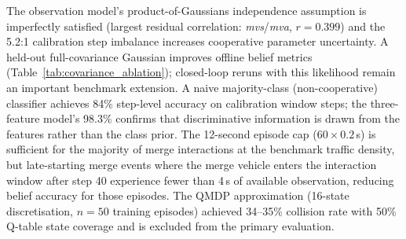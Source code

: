 The observation model's product-of-Gaussians independence assumption is
imperfectly satisfied (largest residual correlation: \emph{mvs}/\emph{mva},
$r{=}0.399$) and the 5.2:1 calibration step imbalance increases
cooperative parameter uncertainty.
A held-out full-covariance Gaussian improves offline belief metrics
(Table~\ref{tab:covariance_ablation}); closed-loop reruns with this likelihood
remain an important benchmark extension.
A naive majority-class (non-cooperative) classifier achieves 84\% step-level
accuracy on calibration window steps; the three-feature model's 98.3\%
confirms that discriminative information is drawn from the features rather
than the class prior.
The 12-second episode cap ($60{\times}0.2$\,s) is sufficient for the
majority of merge interactions at the benchmark traffic density, but late-starting
merge events where the merge vehicle enters the interaction window
after step 40 experience fewer than 4\,s of available observation, reducing
belief accuracy for those episodes.
The QMDP approximation (16-state discretisation, $n{=}50$ training
episodes) achieved 34--35\% collision rate with 50\% Q-table state
coverage and is excluded from the primary evaluation.
